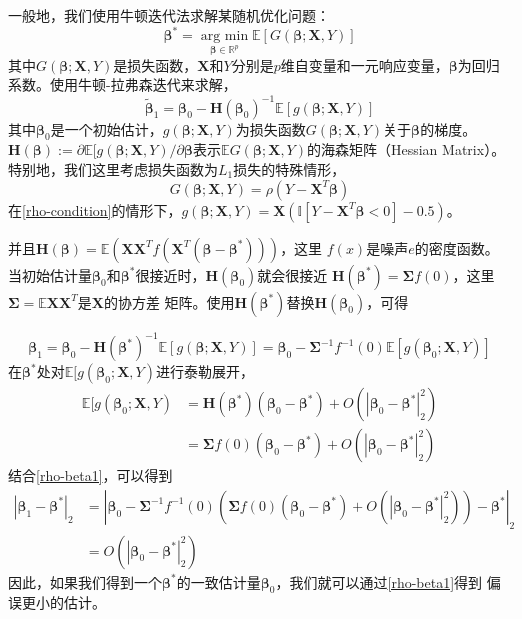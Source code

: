 一般地，我们使用牛顿迭代法求解某随机优化问题：
\begin{equation}\label{randomversion}
    \bm{\beta}^* = \underset{\bm{\beta} \in \mathbb{R}^{p}}{\operatorname{arg\ min}} \mathbb{E}[G(\bm{\beta};\bm{X},Y)]
\end{equation}
其中$G(\bm{\beta};\bm{X}, Y)$是损失函数，$\bm{X}$和$Y$分别是$p$维自变量和一元响应变量，$\bm{\beta}$为回归系数。使用牛顿-拉弗森迭代来求解，
\begin{equation}
    \tilde{\bm{\beta}}_1 = \bm{\beta}_0 - \bm{H}(\bm{\beta}_0)^{-1}\mathbb{E}[g(\bm{\beta};\bm{X},Y)]
\end{equation}
其中$\bm{\beta}_0$是一个初始估计，$g(\bm{\beta};\bm{X},Y)$为损失函数$G(\bm{\beta};\bm{X},Y)$关于$\bm{\beta}$的梯度。\\
$\bm{H}(\bm{\beta}):=\partial\mathbb{E}[g(\bm{\beta};\bm{X},Y)
/\partial\bm{\beta}$表示$\mathbb{E}G(\bm{\beta};\bm{X},Y)$的海森矩阵（Hessian Matrix）。特别地，我们这里考虑损失函数为$L_1$损失的特殊情形，
\begin{equation}\label{rho-condition}
    G(\bm{\beta};\bm{X},Y) = \rho(Y - \bm{X}^T\bm{\beta})
\end{equation}
在\eqref{rho-condition}的情形下，$g(\bm{\beta};\bm{X},Y) = \bm{X}(\mathbb{I}[Y - \bm{X}^T\bm{\beta} < 0] - 0.5)$。

并且$\bm{H}(\bm{\beta}) = \mathbb{E}(\bm{X}\bm{X}^Tf(\bm{X}^T(\bm{\beta} - \bm{\beta}^*)))$，这里
$f(x)$是噪声$e$的密度函数。当初始估计量$\bm{\beta}_0$和$\bm{\beta}^*$很接近时，$\bm{H}(\bm{\beta}_0)$就会很接近
$\bm{H}(\bm{\beta}^*) = \bm{\Sigma}f(0)$，这里$\bm{\Sigma} = \mathbb{E}\bm{X}\bm{X}^T$是$\bm{X}$的协方差
矩阵。使用$\bm{H}(\bm{\beta}^*)$替换$\bm{H}(\bm{\beta}_0)$，可得

\begin{equation}\label{rho-beta1}
    \bm{\beta}_1 = \bm{\beta}_0 - \bm{H}(\bm{\beta}^*)^{-1}\mathbb{E}[g(\bm{\beta};\bm{X}, Y)]
    = \bm{\beta}_0 - \bm{\Sigma}^{-1}f^{-1}(0)\mathbb{E}[g(\bm{\beta}_0;\bm{X},Y)]
\end{equation}
在$\bm{\beta}^*$处对$\mathbb{E}[g(\bm{\beta}_0;\bm{X},Y)$进行泰勒展开，
\begin{equation*}
    \begin{split}
\mathbb{E}[g(\bm{\beta}_0;\bm{X},Y) &= \bm{H}(\bm{\beta}^*)(\bm{\beta}_0 - \bm{\beta}^*) + O(|\bm{\beta}_0 - \bm{\beta}^*|_2^2) \\
 &= \bm{\Sigma}f(0)(\bm{\beta}_0 - \bm{\beta}^*) + O(|\bm{\beta}_0 - \bm{\beta}^*|_2^2)
    \end{split}
\end{equation*}
结合\eqref{rho-beta1}，可以得到
\begin{equation*}
    \begin{split}
        |\bm{\beta}_1 - \bm{\beta}^*|_2 &=  |\bm{\beta}_0 - \bm{\Sigma}^{-1}f^{-1}(0)(
            \bm{\Sigma}f(0)(\bm{\beta}_0 - \bm{\beta}^*) + O(|\bm{\beta}_0 - \bm{\beta}^*|_2^2)
        ) - \bm{\beta}^*|_2\\
        &= O(|\bm{\beta}_0 - \bm{\beta}^*|_2^2)
    \end{split}
\end{equation*}
因此，如果我们得到一个$\bm{\beta}^*$的一致估计量$\bm{\beta}_0$，我们就可以通过\eqref{rho-beta1}得到
偏误更小的估计。

